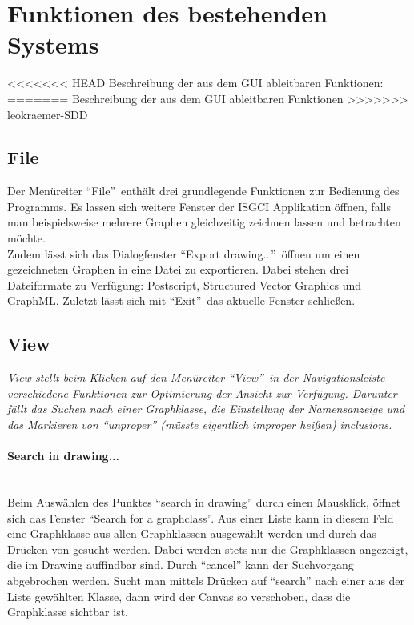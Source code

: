 \documentclass[10pt,a4paper]{article}
\newcommand{\G}[1]{\glqq\text{#1}\grqq} %
\begin{document}
\section{Funktionen des bestehenden Systems}
<<<<<<< HEAD
Beschreibung der aus dem GUI ableitbaren Funktionen:
=======
\label{sec:bestSys}
Beschreibung der aus dem GUI ableitbaren Funktionen
>>>>>>> leokraemer-SDD
\subsection{File}
Der Menüreiter "`File"'\ enthält drei grundlegende Funktionen zur Bedienung des Programms. Es lassen sich weitere Fenster der ISGCI Applikation öffnen, falls man beispielsweise mehrere Graphen gleichzeitig zeichnen lassen und betrachten möchte.\\
Zudem lässt sich das Dialogfenster "`Export drawing..."'\ öffnen um einen gezeichneten Graphen in eine Datei zu exportieren. Dabei stehen drei Dateiformate zu Verfügung: Postscript, Structured Vector Graphics und GraphML. Zuletzt lässt sich mit "`Exit"'\ das aktuelle Fenster schließen.\\

\subsection{View}
\emph{View stellt beim Klicken auf den Menüreiter "`View"'\ in der Navigationsleiste verschiedene Funktionen zur Optimierung der Ansicht zur Verfügung. Darunter fällt das Suchen nach einer Graphklasse, die Einstellung der Namensanzeige und das Markieren von "`unproper"' (müsste eigentlich improper heißen) inclusions.}\\

\paragraph{Search in drawing...}\ \\
Beim Auswählen des Punktes "`search in drawing"' durch einen Mausklick, öffnet sich das Fenster "`Search for a graphclass"'. Aus einer Liste kann in diesem Feld eine Graphklasse aus allen Graphklassen ausgewählt werden und durch das Drücken von \G{Search} gesucht werden. Dabei werden stets nur die Graphklassen angezeigt, die im Drawing auffindbar sind. Durch "`cancel"' kann der Suchvorgang abgebrochen werden. Sucht man mittels Drücken auf "`search"' nach einer aus der Liste gewählten Klasse, dann wird der Canvas so verschoben, dass die Graphklasse sichtbar ist.
\end{document}
